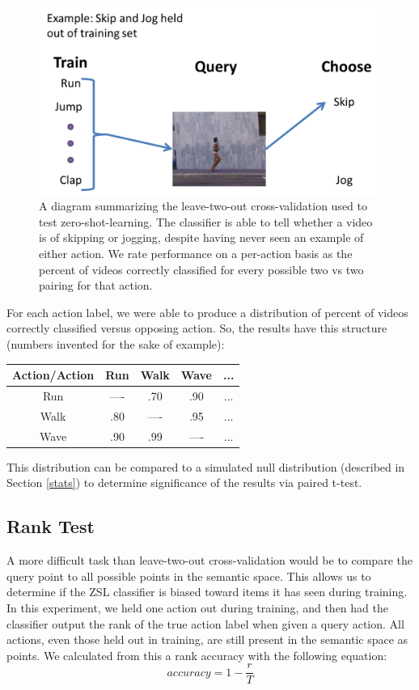 \documentclass{article}
\begin{document}
\begin{figure}[h]
  \centering
  \includegraphics[width = .45\linewidth]{ltocv}
  \caption{A diagram summarizing the leave-two-out cross-validation used to test zero-shot-learning. The classifier is able to tell whether a video is of skipping or jogging, despite having never seen an example of either action. We rate performance on a per-action basis as the percent of videos correctly classified for every possible two vs two pairing for that action.}
  \label{ltocv}
\end{figure}

For each action label, we were able to produce a distribution of percent of videos correctly classified versus opposing action. So, the results have this structure (numbers invented for the sake of example):

\begin{table}[h]
\centering
\begin{tabular}{c|c|c|c|c}
Action/Action & Run & Walk & Wave & ... \\ \hline
Run & ---- & .70 & .90 & ... \\ \hline
Walk & .80 & ---- & .95 & ... \\ \hline
Wave & .90 & .99 & ---- & ... \\
\end{tabular}
\end{table}

This distribution can be compared to a simulated null distribution (described in Section \ref{stats}) to determine significance of the results via paired t-test.

\subsection{Rank Test}
A more difficult task than leave-two-out cross-validation would be to compare the query point to all possible points in the semantic space. This allows us to determine if the ZSL classifier is biased toward items it has seen during training. In this experiment, we held one action out during training, and then had the classifier output the rank of the true action label when given a query action. All actions, even those held out in training, are still present in the semantic space as points. We calculated from this a rank accuracy with the following equation:
\begin{equation}
accuracy = 1 - \frac{r}{T}
\end{equation}
\end{document}
